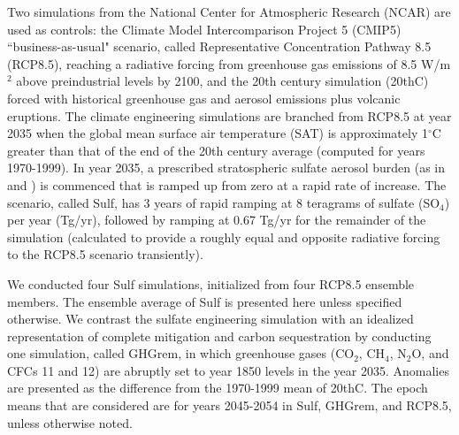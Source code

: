 \documentclass[grl]{AGUTeX}  %
\begin{document}
\begin{article}
Two simulations from the National Center for Atmospheric Research (NCAR) are used as controls: the Climate Model Intercomparison Project 5 (CMIP5) ``business-as-usual" scenario, called Representative Concentration Pathway 8.5 (RCP8.5), reaching a radiative forcing from greenhouse gas emissions of 8.5 W/m$^{2}$ above preindustrial levels by 2100, and the 20th century simulation (20thC) forced with historical greenhouse gas and aerosol emissions plus volcanic eruptions. The climate engineering simulations are branched from RCP8.5 at year 2035 when the global mean surface air temperature (SAT) is approximately 1$^\circ$C greater than that of the end of the 20th century average (computed for years 1970-1999). In year 2035, a prescribed stratospheric sulfate aerosol burden (as in \citet{mccusker12} and \citet{mccusker14}) is commenced that is ramped up from zero at a rapid rate of increase. The scenario, called Sulf, has 3 years of rapid ramping at 8 teragrams of sulfate (SO$_4$) per year (Tg/yr), followed by ramping at 0.67 Tg/yr for the remainder of the simulation (calculated to provide a roughly equal and opposite radiative forcing to the RCP8.5 scenario transiently). %

We conducted four Sulf simulations, initialized from four RCP8.5 ensemble members. The ensemble average of Sulf is presented here unless specified otherwise. We contrast the sulfate engineering simulation with an idealized representation of complete mitigation and carbon sequestration by conducting one simulation, called GHGrem, in which greenhouse gases (CO$_2$, CH$_4$, N$_2$O, and CFCs 11 and 12) are abruptly set to year 1850 levels in the year 2035. Anomalies are presented as the difference from the 1970-1999 mean of 20thC. The epoch means that are considered are for years 2045-2054 in Sulf, GHGrem, and RCP8.5, unless otherwise noted.%


\end{article}
\end{document}
